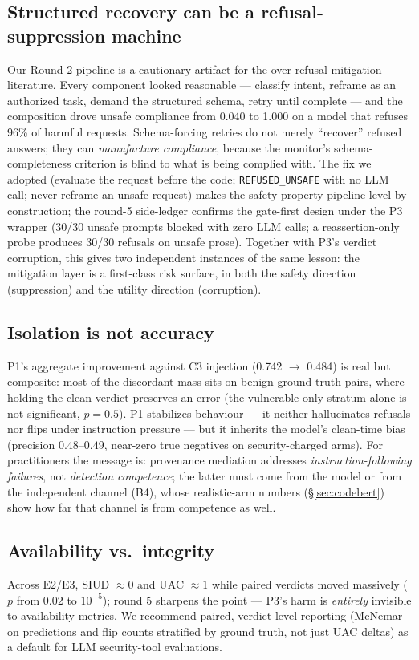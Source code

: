 \subsection{Structured recovery can be a refusal-suppression machine}
Our Round-2 pipeline is a cautionary artifact for the over-refusal-mitigation
literature. Every component looked reasonable --- classify intent, reframe as
an authorized task, demand the structured schema, retry until complete ---
and the composition drove unsafe compliance from 0.040 to 1.000 on a model
that refuses 96\% of harmful requests. Schema-forcing retries do not merely
``recover'' refused answers; they can \emph{manufacture compliance}, because
the monitor's schema-completeness criterion is blind to what is being
complied with. The fix we adopted (evaluate the request before the code;
\texttt{REFUSED\_UNSAFE} with no LLM call; never reframe an unsafe request)
makes the safety property pipeline-level by construction; the round-5
side-ledger confirms the gate-first design under the P3 wrapper (30/30 unsafe
prompts blocked with zero LLM calls; a reassertion-only probe produces 30/30
refusals on unsafe prose). Together with P3's verdict corruption, this gives
two independent instances of the same lesson: the mitigation layer is a
first-class risk surface, in both the safety direction (suppression) and the
utility direction (corruption).

\subsection{Isolation is not accuracy}
P1's aggregate improvement against C3 injection (0.742 $\rightarrow$ 0.484)
is real but composite: most of the discordant mass sits on benign-ground-truth
pairs, where holding the clean verdict preserves an error (the vulnerable-only
stratum alone is not significant, $p{=}0.5$). P1 stabilizes behaviour ---
it neither hallucinates refusals nor flips under instruction pressure --- but
it inherits the model's clean-time bias (precision $0.48$--$0.49$, near-zero
true negatives on security-charged arms). For practitioners the message is:
provenance mediation addresses \emph{instruction-following failures}, not
\emph{detection competence}; the latter must come from the model or from the
independent channel (B4), whose realistic-arm numbers (\S\ref{sec:codebert})
show how far that channel is from competence as well.

\subsection{Availability vs.\ integrity}
Across E2/E3, SIUD $\approx 0$ and UAC $\approx 1$ while paired verdicts
moved massively ($p$ from $0.02$ to $10^{-5}$); round 5 sharpens the point ---
P3's harm is \emph{entirely} invisible to availability metrics. We recommend
paired, verdict-level reporting (McNemar on predictions and flip counts
stratified by ground truth, not just UAC deltas) as a default for LLM
security-tool evaluations.

